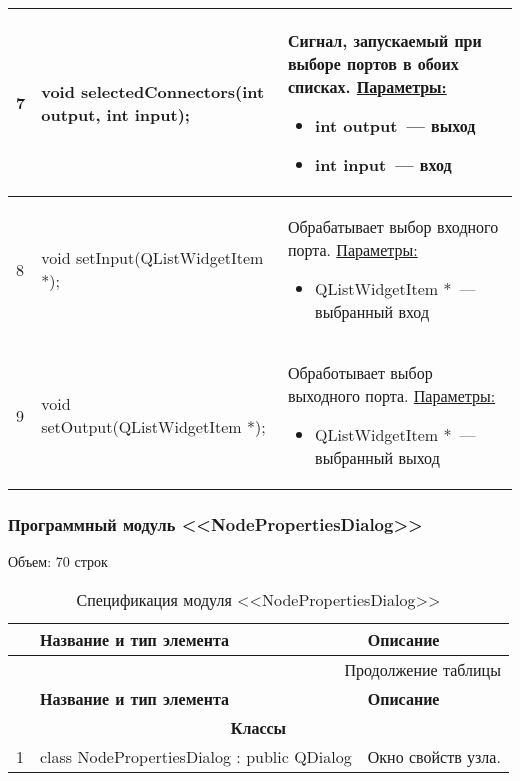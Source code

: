 \begin{longtable}[h]{|p{}|p{}|p{}|}
  7 & void selectedConnectors(int output, int input); & Сигнал, запускаемый при выборе портов в обоих списках.\newline
    \uline{Параметры:}
    \begin{itemize}[nolistsep,label=,leftmargin=0cm]
      \item int output~--- выход
      \item int input~--- вход
    \end{itemize}\\ \hline
  8 & void setInput(QListWidgetItem *); & Обрабатывает выбор входного порта.\newline
    \uline{Параметры:}
    \begin{itemize}[nolistsep,label=,leftmargin=0cm]
      \item QListWidgetItem *~--- выбранный вход
    \end{itemize}\\ \hline
  9 & void setOutput(QListWidgetItem *); & Обработывает выбор выходного порта.\newline
    \uline{Параметры:}
    \begin{itemize}[nolistsep,label=,leftmargin=0cm]
      \item QListWidgetItem *~--- выбранный выход
    \end{itemize}\\ \hline
\end{longtable}
\normalsize
\onehalfspacing


\subsubsection*{Программный модуль <<NodePropertiesDialog>>}
Объем: 70 строк

\small
\singlespacing
\begin{longtable}[h]{|p{}|p{}|p{}|}
  \caption{Спецификация модуля <<NodePropertiesDialog>>}
	\\ \hline
	  \textbf{\No}                  &
	  \textbf{Название и тип элемента}  &
	  \textbf{Описание}
	\\ \hline
  \endfirsthead

  \multicolumn{3}{r}{Продолжение таблицы \thetable{}}
  \\ \hline
	  \textbf{\No}                  &
	  \textbf{Название и тип элемента}  &
	  \textbf{Описание}
	\\ \hline
  \endhead

  \multicolumn{3}{|c|}{\textbf{Классы}} \\
  \hline
  1 & class NodePropertiesDialog : public QDialog & Окно свойств узла. \\ \hline
\end{longtable}
\normalsize
\onehalfspacing


